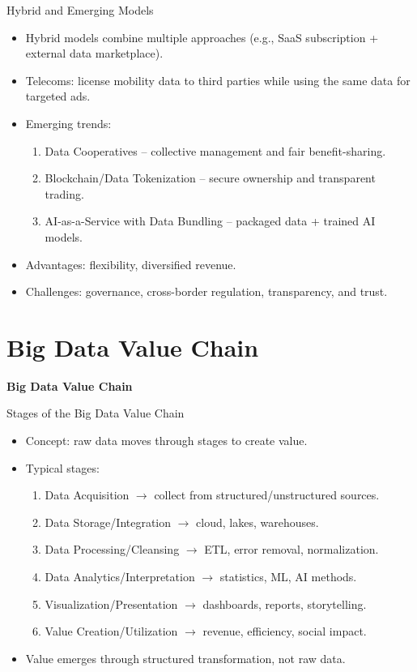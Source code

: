 \documentclass[aspectratio=169, table]{beamer}
\begin{document}
\begin{frame}{Hybrid and Emerging Models}
	\vspace{20pt}
	\begin{itemize}
		\item Hybrid models combine multiple approaches (e.g., SaaS subscription + external data marketplace).  
		\item Telecoms: license mobility data to third parties while using the same data for targeted ads.  
		\item Emerging trends:  
		\begin{enumerate}
			\item Data Cooperatives – collective management and fair benefit-sharing.  
			\item Blockchain/Data Tokenization – secure ownership and transparent trading.  
			\item AI-as-a-Service with Data Bundling – packaged data + trained AI models.  
		\end{enumerate}
		\item Advantages: flexibility, diversified revenue.  
		\item Challenges: governance, cross-border regulation, transparency, and trust.  
	\end{itemize}
\end{frame}

\section{Big Data Value Chain}

\begin{frame}{\hfill}
	\centering
	\Huge{\textbf{Big Data Value Chain}}
\end{frame}

\begin{frame}{Stages of the Big Data Value Chain}
	\vspace{15pt}
	\begin{itemize}
		\item Concept: raw data moves through stages to create value.  
		\item Typical stages:  
		\begin{enumerate}
			\item Data Acquisition $\rightarrow$ collect from structured/unstructured sources.  
			\item Data Storage/Integration $\rightarrow$ cloud, lakes, warehouses.  
			\item Data Processing/Cleansing $\rightarrow$ ETL, error removal, normalization.  
			\item Data Analytics/Interpretation $\rightarrow$ statistics, ML, AI methods.  
			\item Visualization/Presentation $\rightarrow$ dashboards, reports, storytelling.  
			\item Value Creation/Utilization $\rightarrow$ revenue, efficiency, social impact.  
		\end{enumerate}
		\item Value emerges through structured transformation, not raw data.  
	\end{itemize}
\end{frame}
\end{document}
